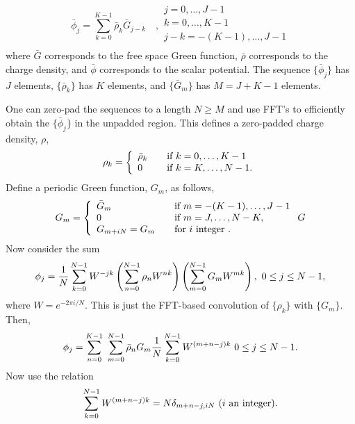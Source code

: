 \begin{equation}
\bar{\phi}_j=\sum_{k=0}^{K-1}\bar{\rho}_k \bar{G}_{j-k}\quad,
\begin{array}{l}
j=0,\ldots,J-1 \\
k=0,\ldots,K-1 \\
j-k=-(K-1),\ldots,J-1 \\
\end{array}
\label{eq:bruteforceconvolution}
\end{equation}
where $\bar{G}$ corresponds to the free space Green function, $\bar{\rho}$ corresponds to the charge density, and $\bar{\phi}$ corresponds to the scalar potential.
The sequence $\{\bar{\phi}_j\}$ has $J$ elements, $\{\bar{\rho}_k\}$ has $K$ elements, and $\{\bar{G}_m\}$ has $M=J+K-1$ elements.

One can zero-pad the sequences to a length $N\ge M$ and use FFT's to efficiently obtain the $\{\bar{\phi}_j\}$ in the unpadded region.
This defines a zero-padded charge density, $\rho$,
\begin{equation}
\rho_k=\left\{
\begin{array}{l l}
\bar{\rho}_k & \quad \text{if }k=0,\ldots,K-1 \\
0 & \quad \text{if }k=K,\ldots,N-1. \\
\end{array}\right.
\end{equation}
Define a periodic Green function, $G_m$, as follows,
\begin{equation}
G_m=\left\{
\begin{array}{l l}
\bar{G}_m & \quad \text{if }m=-(K-1),\ldots,J-1 \\
0 & \quad \text{if }m=J,\ldots,N-K, \\
G_{m+iN}=G_{m} & \quad \text{for } i \text{ integer }.
\end{array}\right.
\label{eq:periodicgreenfunction}G
\end{equation}
Now consider the sum
\begin{equation}
{\phi}_j={1\over N}\sum_{k=0}^{N-1} W^{-jk}
                    \left(\sum_{n=0}^{N-1} \rho_n W^{nk}\right)
                    \left(\sum_{m=0}^{N-1} G_m W^{mk}\right),
~~~~~~0 \le j \le N-1,
\label{eq:fftconvolution}
\end{equation}
where $W=e^{-2\pi i/N}$. This is just the FFT-based convolution of $\{\rho_k\}$ with $\{G_m\}$.
Then,
\begin{equation}
{\phi}_j=
          \sum_{n=0}^{K-1}~
          \sum_{m=0}^{N-1} \bar{\rho}_n G_m
{1\over N}\sum_{k=0}^{N-1} W^{(m+n-j)k}
~~~~~~0 \le j \le N-1.
\end{equation}
Now use the relation
\begin{equation}
\sum_{k=0}^{N-1} W^{(m+n-j)k}= N \delta_{m+n-j,iN}~~~~~(i~\rm an~integer).
\end{equation}

